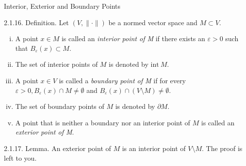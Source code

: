 \documentclass[smaller,hyperref={CJKbookmarks=true}]{beamer}
\begin{document}
\begin{frame}[c]{Interior, Exterior and Boundary Points}
\begin{spacing}{1.1}
\alert{2.1.16. Definition.} Let $(V,\|\cdot\|)$ be a normed vector space and $M\subset V$.
\begin{enumerate}[(i)]
  \item A point $x\in M$ is called an \emph{interior point of M} if there exists an $\varepsilon>0$ such that $B_{\varepsilon}(x)\subset M$.
  \item The set of interior points of $M$ is denoted by $\text{int}~M$.
  \item A point $x\in V$ is called a \emph{boundary point of M} if for every $\varepsilon>0,B_{\varepsilon}(x)\cap M\neq\emptyset$ and $B_{\varepsilon}(x)\cap(V\setminus M)\neq\emptyset$.
  \item The set of boundary points of $M$ is denoted by $\partial M$.
  \item A point that is neither a boundary nor an interior point of $M$ is called an \emph{exterior point of M}.
\end{enumerate}
\alert{2.1.17. Lemma.} An exterior point of $M$ is an interior point of $V\setminus M$. The proof is left to you.
\end{spacing}
\end{frame}
\end{document}
